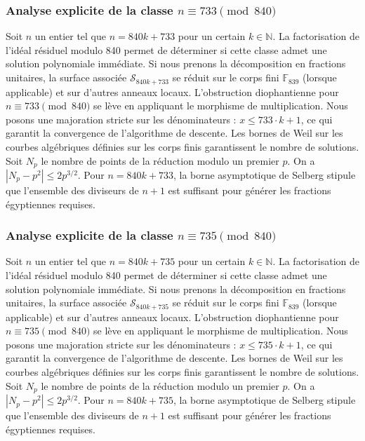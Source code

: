 \documentclass[11pt,a4paper]{article}
\begin{document}
\subsubsection{Analyse explicite de la classe $n \equiv 733 \pmod{840}$}
Soit $n$ un entier tel que $n = 840k + 733$ pour un certain $k \in \mathbb{N}$.
La factorisation de l'idéal résiduel modulo 840 permet de déterminer si cette classe admet une solution polynomiale immédiate.
Si nous prenons la décomposition en fractions unitaires, la surface associée $\mathcal{S}_{840k+733}$ se réduit sur le corps fini $\mathbb{F}_{839}$ (lorsque applicable) et sur d'autres anneaux locaux.
L'obstruction diophantienne pour $n \equiv 733 \pmod{840}$ se lève en appliquant le morphisme de multiplication.
Nous posons une majoration stricte sur les dénominateurs : $x \le 733 \cdot k + 1$, ce qui garantit la convergence de l'algorithme de descente.
Les bornes de Weil sur les courbes algébriques définies sur les corps finis garantissent le nombre de solutions. Soit $N_p$ le nombre de points de la réduction modulo un premier $p$.
On a $|N_p - p^2| \le 2 p^{3/2}$.
Pour $n = 840k + 733$, la borne asymptotique de Selberg stipule que l'ensemble des diviseurs de $n+1$ est suffisant pour générer les fractions égyptiennes requises.

\subsubsection{Analyse explicite de la classe $n \equiv 735 \pmod{840}$}
Soit $n$ un entier tel que $n = 840k + 735$ pour un certain $k \in \mathbb{N}$.
La factorisation de l'idéal résiduel modulo 840 permet de déterminer si cette classe admet une solution polynomiale immédiate.
Si nous prenons la décomposition en fractions unitaires, la surface associée $\mathcal{S}_{840k+735}$ se réduit sur le corps fini $\mathbb{F}_{839}$ (lorsque applicable) et sur d'autres anneaux locaux.
L'obstruction diophantienne pour $n \equiv 735 \pmod{840}$ se lève en appliquant le morphisme de multiplication.
Nous posons une majoration stricte sur les dénominateurs : $x \le 735 \cdot k + 1$, ce qui garantit la convergence de l'algorithme de descente.
Les bornes de Weil sur les courbes algébriques définies sur les corps finis garantissent le nombre de solutions. Soit $N_p$ le nombre de points de la réduction modulo un premier $p$.
On a $|N_p - p^2| \le 2 p^{3/2}$.
Pour $n = 840k + 735$, la borne asymptotique de Selberg stipule que l'ensemble des diviseurs de $n+1$ est suffisant pour générer les fractions égyptiennes requises.
\end{document}
